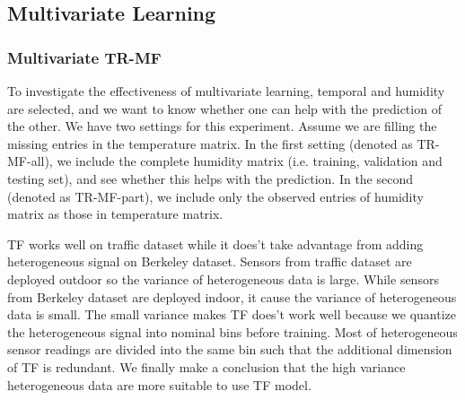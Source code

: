 \subsection{Multivariate Learning}
\subsubsection{Multivariate TR-MF}
To investigate the effectiveness of multivariate learning, temporal and humidity are selected, and we want to know whether one can help with the prediction of the other.
We have two settings for this experiment. Assume we are filling the missing entries in the temperature matrix. In the first setting (denoted as TR-MF-all), we include the complete humidity matrix (i.e. training, validation and testing set), and see whether this helps with the prediction. In the second (denoted as TR-MF-part), we include only the observed entries of humidity matrix as those in temperature matrix. 




TF works well on traffic dataset while it does't take advantage from adding heterogeneous signal on Berkeley dataset.
Sensors from traffic dataset are deployed outdoor so the variance of heterogeneous data is large.
While sensors from Berkeley dataset are deployed indoor, it cause the variance of heterogeneous data is small.
The small variance makes TF does't work well because we quantize the heterogeneous signal into nominal bins before training.
Most of heterogeneous sensor readings are divided into the same bin such that the additional dimension of TF is redundant.
We finally make a conclusion that the high variance heterogeneous data are more suitable to use TF model.



